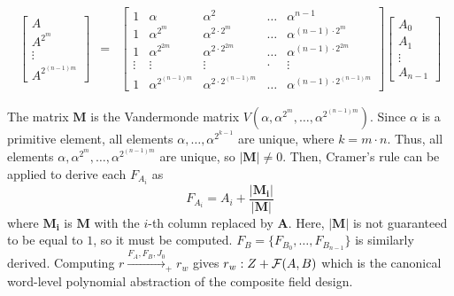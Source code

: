 \begin{eqnarray}
\begin{bmatrix}
A \\ A^{2^m} \\ \vdots \\ A^{2^{(n-1)m}}
\end{bmatrix}  &=&
\begin{bmatrix}
1      &   \alpha          & \alpha^2         & \dots & \alpha^{n-1}\\
1      &   \alpha^{2^m}     & \alpha^{2\cdot2^m}    & \dots & \alpha^{(n-1)\cdot 2^m}\\
1      &   \alpha^{2^{2m}}   & \alpha^{2\cdot2^{2m}}    & \dots & \alpha^{(n-1)\cdot 2^{2m}}\\
\vdots & \vdots            & \vdots           & \cdot & \vdots \\
1      &   \alpha^{2^{(n-1)m}} & \alpha^{2\cdot2^{(n-1)m}} & \dots & \alpha^{(n-1)\cdot 2^{(n-1)m}}
\end{bmatrix}
\begin{bmatrix}
A_0 \\ A_1 \\ \vdots \\ A_{n-1}
\end{bmatrix} \label{eqn:matrixForm}
\end{eqnarray}

The matrix $\mathbf{M}$ is the Vandermonde matrix $V(\alpha,\alpha^{2^m},\dots,\alpha^{2^{(n-1)m}})$.
Since $\alpha$ is a primitive element, 
all elements $\alpha,\dots,\alpha^{2^{k-1}}$ are unique, where $k=m\cdot n$. Thus, 
all elements $\alpha,\alpha^{2^m},\dots,\alpha^{2^{(n-1)m}}$ are unique, so
$|\mathbf{M}| \neq 0$. Then, Cramer's rule can be applied to derive each $F_{A_i}$ as 
\begin{equation}
F_{A_i}=A_i+\frac{|\mathbf{M_i}|}{|\mathbf{M}|}
\end{equation}
where $\mathbf{M_i}$ is $\mathbf{M}$ with the $i$-th column replaced
by $\mathbf{A}$. Here, $|\mathbf{M}|$ is not guaranteed to be equal to $1$,  
so it must be computed. 
$F_B=\{F_{B_0},\dots,F_{B_{n-1}}\}$ is similarly derived.
Computing $r\xrightarrow{F_A,F_B,J_0}_+ r_w$ gives $r_w: Z+{\mathcal{F}}(A,B)$ which is the 
canonical word-level polynomial abstraction of the composite field design.

